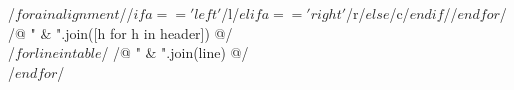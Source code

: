 \begin{tabularx}{\linewidth}{/$ for a in alignment $//$if a == 'left'$/l/$elif a == 'right'$/r/$else$/c/$endif$//$endfor$/}
/@ " & ".join([h for h in header]) @/ \\
/$for line in table $/
/@ " & ".join(line) @/ \\
/$endfor$/
\end{tabularx}